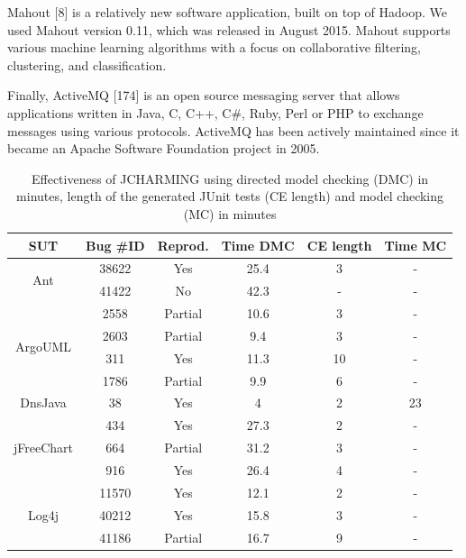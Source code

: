 \documentclass[12pt]{report}
\begin{document}
Mahout {[}8{]} is a relatively new software application, built on top of
Hadoop. We used Mahout version 0.11, which was released in August 2015.
Mahout supports various machine learning algorithms with a focus on
collaborative filtering, clustering, and classification.

Finally, ActiveMQ {[}174{]} is an open source messaging server that
allows applications written in Java, C, C++, C\#, Ruby, Perl or PHP to
exchange messages using various protocols. ActiveMQ has been actively
maintained since it became an Apache Software Foundation project in
2005.

\begin{table}[]
\centering
\caption{Effectiveness of JCHARMING using directed model checking (DMC) in minutes, length of the generated JUnit tests (CE length) and model checking (MC) in minutes}
\begin{tabular}{c|c|c|c|c|c}
SUT                         & Bug \#ID & Reprod. & Time DMC & CE length & Time MC \\ \hline \hline
\multirow{2}{*}{Ant}        & 38622    & Yes     & 25.4   & 3  & -       \\
                            & 41422    & No      & 42.3   & -  & -       \\ \hline
\multirow{4}{*}{ArgoUML}    & 2558     & Partial & 10.6   & 3  & -       \\
                            & 2603     & Partial & 9.4    & 3  & -       \\
                            & 311      & Yes     & 11.3   & 10  & -       \\
                            & 1786     & Partial & 9.9    & 6  & -       \\  \hline
DnsJava                     & 38       & Yes     & 4      & 2  & 23      \\ \hline
\multirow{3}{*}{jFreeChart} & 434      & Yes     & 27.3   & 2  & -       \\
                            & 664      & Partial & 31.2   & 3   & -       \\
                            & 916      & Yes     & 26.4   & 4  & -       \\ \hline
\multirow{7}{*}{Log4j}      & 11570    & Yes     & 12.1   & 2  & -       \\
                            & 40212    & Yes     & 15.8   & 3  & -       \\
                            & 41186    & Partial & 16.7   & 9  & -       \\

\end{tabular}
\end{table}
\end{document}
